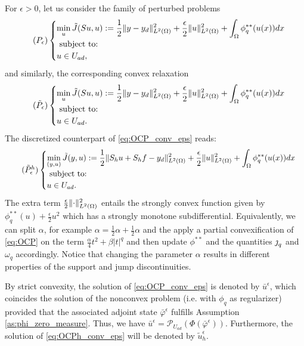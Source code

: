 {For $\epsilon>0$, let  us consider the family of perturbed problems
 \begin{equation}
		\tag{$P_{\epsilon}$} \label{eq:OCP_eps}
		\begin{cases}
			\displaystyle\min_{u} \tilde J(Su,u) := \frac12 \norm{y-y_d}^2_{L^2(\om)} +\frac{\epsilon}{2}\norm{u}_{L^2(\om)}^2 + \int_\om \phi_q^{**} (u(x)) dx \\
			\hbox{ subject to: }\\
			 u \in U_{ad},
		\end{cases}
	\end{equation}
and similarly, the corresponding convex relaxation
 \begin{equation}
		\tag{$\tilde P_{\epsilon}$} \label{eq:OCP_conv_eps}
		\begin{cases}
			\displaystyle\min_{u} \tilde J(Su,u) := \frac12 \norm{y-y_d}^2_{L^2(\om)} +\frac{\epsilon}{2}\norm{u}_{L^2(\om)}^2 + \int_\om \phi_q^{**} (u(x)) dx \\
			\hbox{ subject to: }\\
			 u \in U_{ad}.		\end{cases}
	\end{equation}
The discretized counterpart of \eqref{eq:OCP_conv_eps} reads: 
 \begin{equation}
		\tag{$\tilde P^h_{\epsilon}$} \label{eq:OCPh_conv_eps}
		\begin{cases}
			\displaystyle\min_{(y,u)} \tilde J(y,u) := \frac12 \norm{S_hu+S_hf-y_d}^2_{L^2(\om)} +\frac{\epsilon}{2}\norm{u}_{L^2(\om)}^2 + \int_\om \phi_q^{**} (u(x)) dx \\
			\hbox{ subject to: }\\
			u\in U_{ad}.
		\end{cases}
	\end{equation}
 The extra term $\frac{\epsilon}{2}\lVert \cdot \rVert_{L^2(\Omega)}^2$ entails the strongly convex function given by $\phi_q^{**}(u) + \frac{\epsilon}{2}u^2$ which has a strongly monotone subdifferential. Equivalently, we can split $\alpha$, for example $\alpha = \frac12\alpha+\frac12\alpha$ and the apply a partial convexification of \eqref{eq:OCP} on the term $\frac{\alpha}{4}t^2+\beta|t|^q$ and then update $\phi^{**}$ and the quantities $\operatorname{\jmath}_q$ and $\omega_q$ accordingly. Notice that changing the parameter $\alpha$ results in different properties of the support and jump discontinuities.

By strict convexity,  the solution of \eqref{eq:OCP_conv_eps} is denoted by $\bar{u}^\epsilon$, which coincides the solution of the nonconvex problem (i.e. with $\phi_q$ as regularizer) provided that the associated adjoint state $\bar{\varphi}^\epsilon$ fulfills Assumption \ref{as:phi_zero_measure}. Thus, we have $\bar{u}^\epsilon = \mathcal{P}_{U_{ad}}(\Phi(\bar{\varphi}^\epsilon))$. Furthermore, the solution of \eqref{eq:OCPh_conv_eps} will be denoted by $\tilde{u}_h^\epsilon$. 

}

